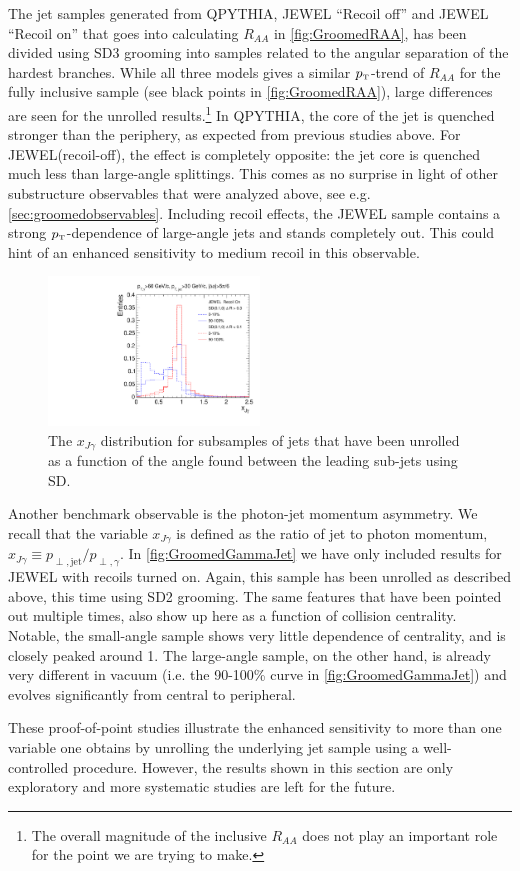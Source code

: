 The jet samples generated from QPYTHIA, JEWEL ``Recoil off'' and JEWEL ``Recoil on'' that goes into calculating $R_{AA}$ in \autoref{fig:GroomedRAA}, has been divided using SD3 grooming into samples related to the angular separation of the hardest branches. While all three models gives a similar $p_{\text{\tiny T}}$-trend of $R_{AA}$ for the fully inclusive sample (see black points in \autoref{fig:GroomedRAA}), large differences are seen for the unrolled results.\footnote{The overall magnitude of the inclusive $R_{AA}$ does not play an important role for the point we are trying to make.} In QPYTHIA, the core of the jet is quenched stronger than the periphery, as expected from previous studies above. For JEWEL(recoil-off), the effect is completely opposite: the jet core is quenched much less than large-angle splittings. This comes as no surprise in light  of other substructure observables that were analyzed above, see e.g. \autoref{sec:groomedobservables}. Including recoil effects, the JEWEL sample contains a strong $p_{\text{\tiny T}}$-dependence of large-angle jets and stands completely out. This could hint of an enhanced sensitivity to medium recoil in this observable.

\begin{figure}[th]
\centering
\includegraphics[width=0.5\textwidth]
{figures/Observables_GammaJet/JEWEL-photon-jet-recoilOn-linear}%
\caption{The $x_{J\gamma}$ distribution for subsamples of jets that have been unrolled as a function of the angle found between the leading sub-jets using SD. }
\label{fig:GroomedGammaJet}
\end{figure}
Another benchmark observable is the photon-jet momentum asymmetry. We recall that the variable $x_{J\gamma}$ is defined as the ratio of jet to photon momentum, $x_{J\gamma} \equiv p_{\perp,\text{jet}}/p_{\perp,\gamma}$.
In \autoref{fig:GroomedGammaJet} we have only included results for JEWEL with recoils turned on. Again, this sample has been unrolled as described above, this time using SD2 grooming. The same features that have been pointed out multiple times, also show up here as a function of collision centrality. Notable, the small-angle sample shows very little dependence of centrality, and is closely peaked around 1. The large-angle sample, on the other hand, is already very different in vacuum (i.e. the 90-100\% curve in \autoref{fig:GroomedGammaJet}) and evolves significantly from central to peripheral. 

These proof-of-point studies illustrate the enhanced sensitivity to more than one variable one obtains by unrolling the underlying jet sample using a well-controlled procedure.
However, the results shown in this section are only exploratory and more systematic studies are left for the future.

